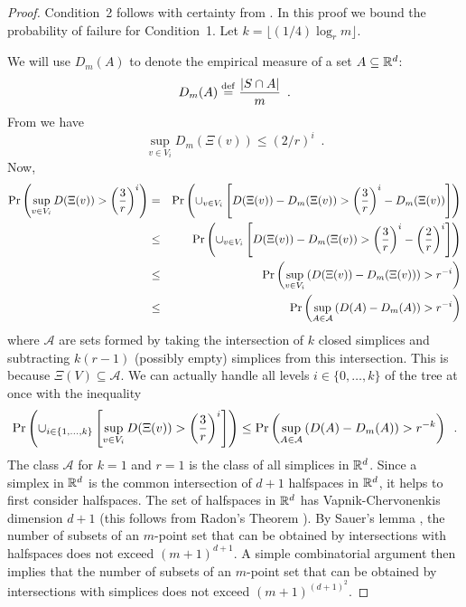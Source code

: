 \documentclass{patmorin}
\begin{document}
\begin{proof}
  Condition~2 follows with certainty from .
  In this proof we bound the probability of failure for Condition~1.
  Let $k=\lfloor (1/4)\log_rm\rfloor$.

  We will use $D_m(A)$ to denote the empirical measure of a set
  $A\subseteq\mathbb{R}^d$:
  \[ 
    D_m (A) \isdef {{|S\cap A|} \over m} \enspace .
  \]  
  From  we have
  \[
    \sup_{v\in V_i} D_m(\Xi(v)) \le (2/r)^i \enspace .
  \]
  Now,
  \begin{eqnarray*}
    \Pr \left( \sup_{v\in V_i} D ( \Xi(v) ) > \left(\frac{3}{r}\right)^i \right)
    &=& \Pr \left( \cup_{v\in V_i} \left[ D ( \Xi(v) ) - D_m(\Xi(v))  >  \left(\frac{3}{r}\right)^i - D_m(\Xi(v)) \right] \right) \cr
    &\le& \Pr \left( \cup_{v\in V_i} \left[ D ( \Xi(v) ) - D_m(\Xi(v))  > \left(\frac{3}{r}\right)^i - \left(\frac{2}{r}\right)^i  \right] \right) \cr
    &\le& \Pr \left( \sup_{v\in V_i} \left(  D ( \Xi(v) ) - D_m(\Xi(v)) \right) > r^{-i} \right) \cr
    &\le& \Pr \left( \sup_{A \in {\mathcal{A}}} \left( D ( A ) - D_m ( A ) \right)  > r^{-i} \right) \cr
  \end{eqnarray*}
  where $\mathcal{A}$ are sets formed by taking the intersection of $k$
  closed simplices and subtracting $k(r-1)$  (possibly empty) simplices
  from this intersection.  This is because $\Xi(V)\subseteq \mathcal{A}$.
  We can actually handle all levels $i\in \{0,\ldots,k\}$ of the tree
  at once with the inequality
  \begin{eqnarray*}
  \Pr \left( \cup_{i\in\{1,\ldots,k\}}\left[\sup_{v\in V_i} D ( \Xi(v) ) > \left(\frac{3}{r}\right)^i \right] \right )
  \leq \Pr \left( \sup_{A \in {\mathcal{A}}} \left( D ( A ) - D_m ( A ) \right)  > r^{-k} \right) \enspace .
  \end{eqnarray*}
  The class $\mathcal{A}$ for $k=1$ and $r=1$ is the class of all
  simplices in $\mathbb{R}^d$.   Since a simplex in $\mathbb{R}^d$ is the common
  intersection of $d+1$ halfspaces in $\mathbb{R}^d$, it helps to first consider
  halfspaces.  The set of halfspaces in $\mathbb{R}^d$ has Vapnik-Chervonenkis
  dimension $d+1$ (this follows from Radon's Theorem \cite{e93}).
  By Sauer's lemma \cite{s72}\cite[pages~28--29]{dl01}, the number of
  subsets of an $m$-point set that can be obtained by intersections
  with halfspaces does not exceed $(m+1)^{d+1}$.  A simple combinatorial
  argument then implies that the number of subsets of an $m$-point set
  that can be obtained by intersections with simplices does not exceed
  $(m+1)^{(d+1)^2}$.


\end{proof}
\end{document}
